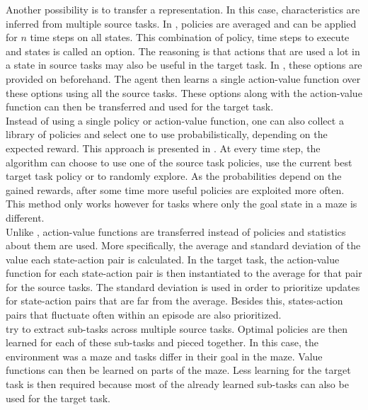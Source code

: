 Another possibility is to transfer a representation. In this case, characteristics are inferred from multiple source tasks.
In \cite{Bernstein99reusingold}, policies are averaged and can be applied for $n$ time steps on all states.
This combination of policy, time steps to execute and states is called an option.
The reasoning is that actions that are used a lot in a state in source tasks may also be useful in the target task. In \cite{perkins1999using}, these options are provided on beforehand.
The agent then learns a single action-value function over these options using all the source tasks.
These options along with the action-value function can then be transferred and used for the target task.\\

Instead of using a single policy or action-value function, one can also collect a library of policies and select one to use probabilistically, depending on the expected reward. This approach is presented in \cite{fernandez2006probabilistic,fernandez2013learning}. At every time step, the algorithm can choose to use one of the source task policies, use the current best target task policy or to randomly explore. As the probabilities depend on the gained rewards, after some time more useful policies are exploited more often. This method only works however for tasks where only the goal state in a maze is different.\\

Unlike \cite{conf/cira/TanakaY03}, action-value functions are transferred instead of policies and statistics about them are used.
More specifically, the average and standard deviation of the value each state-action pair is calculated.
In the target task, the action-value function for each state-action pair is then instantiated to the average for that pair for the source tasks.
The standard deviation is used in order to prioritize updates for state-action pairs that are far from the average.
Besides this, states-action pairs that fluctuate often within an episode are also prioritized.\\

\cite{journals/ml/FosterD02} try to extract sub-tasks across multiple source tasks.
Optimal policies are then learned for each of these sub-tasks and pieced together.
In this case, the environment was a maze and tasks differ in their goal in the maze.
Value functions can then be learned on parts of the maze.
Less learning for the target task is then required because most of the already learned sub-tasks can also be used for the target task.\\

